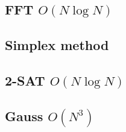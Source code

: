 \documentclass[10pt]{article}
\begin{document}
\begin{multicols}{2}
\subsection{FFT $O(N\log{N})$}

\subsection{Simplex method}

\subsection{2-SAT $O(N\log{N})$}

\subsection{Gauss $O(N^{3})$}

\end{multicols}
\newpage
\end{document}

